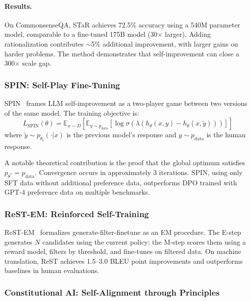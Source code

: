 \paragraph{Results.}
On CommonsenseQA, STaR achieves 72.5\% accuracy using a 540M parameter model, comparable to a fine-tuned 175B model (30$\times$ larger). Adding rationalization contributes $\sim$5\% additional improvement, with larger gains on harder problems. The method demonstrates that self-improvement can close a 300$\times$ scale gap.

\subsubsection{SPIN: Self-Play Fine-Tuning}
\label{sec:spin}

SPIN~\citep{chen2024spin} frames LLM self-improvement as a two-player game between two versions of the same model. The training objective is:
\begin{equation}
    L_{\text{SPIN}}(\theta) = \mathbb{E}_{x \sim D}\left[\mathbb{E}_{y \sim p_{\text{data}}}\left[\log \sigma\left(\lambda(h_\theta(x,y) - h_\theta(x,\tilde{y}))\right)\right]\right]
    \label{eq:spin}
\end{equation}
where $\tilde{y} \sim p_{\theta_t}(\cdot|x)$ is the previous model's response and $y \sim p_{\text{data}}$ is the human response.

A notable theoretical contribution is the proof that the global optimum satisfies $p_{\theta^*} = p_{\text{data}}$. Convergence occurs in approximately 3 iterations. SPIN, using only SFT data without additional preference data, outperforms DPO trained with GPT-4 preference data on multiple benchmarks.

\subsubsection{ReST-EM: Reinforced Self-Training}
\label{sec:rest-em}

ReST-EM~\citep{gulcehre2023rest} formalizes generate-filter-finetune as an EM procedure. The E-step generates $N$ candidates using the current policy; the M-step scores them using a reward model, filters by threshold, and fine-tunes on filtered data. On machine translation, ReST achieves 1.5--3.0 BLEU point improvements and outperforms baselines in human evaluations.

\subsubsection{Constitutional AI: Self-Alignment through Principles}
\label{sec:constitutional-ai}

